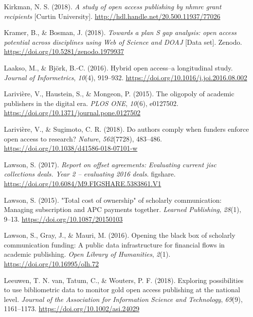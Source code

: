 \documentclass[a4paper,man,floatsintext,longtable,noextraspace,12pt]{apa6}
\newlength{\cslhangindent}
\newenvironment{cslreferences}%
  {\setlength{\parindent}{0pt}%
  \everypar{\setlength{\hangindent}{\cslhangindent}}\ignorespaces}%
  {\par}
\begin{document}
\begin{cslreferences}
\leavevmode\hypertarget{ref-Kirkman_2018}{}%
Kirkman, N. S. (2018). \emph{A study of open access publishing by nhmrc
grant recipients} {[}Curtin University{]}.
\url{http://hdl.handle.net/20.500.11937/77026}

\leavevmode\hypertarget{ref-Kramer_2018}{}%
Kramer, B., \& Bosman, J. (2018). \emph{Towards a plan S gap analysis:
open access potential across disciplines using Web of Science and DOAJ}
{[}Data set{]}. Zenodo. \url{https://doi.org/10.5281/zenodo.1979937}

\leavevmode\hypertarget{ref-Laakso_2016}{}%
Laakso, M., \& Björk, B.-C. (2016). Hybrid open access--a longitudinal
study. \emph{Journal of Informetrics}, \emph{10}(4), 919--932.
\url{https://doi.org/10.1016/j.joi.2016.08.002}

\leavevmode\hypertarget{ref-Larivi_re_2015}{}%
Larivière, V., Haustein, S., \& Mongeon, P. (2015). The oligopoly of
academic publishers in the digital era. \emph{PLOS ONE}, \emph{10}(6),
e0127502. \url{https://doi.org/10.1371/journal.pone.0127502}

\leavevmode\hypertarget{ref-Larivi_re_2018}{}%
Larivière, V., \& Sugimoto, C. R. (2018). Do authors comply when funders
enforce open access to research? \emph{Nature}, \emph{562}(7728),
483--486. \url{https://doi.org/10.1038/d41586-018-07101-w}

\leavevmode\hypertarget{ref-Lawson_2018}{}%
Lawson, S. (2017). \emph{Report on offset agreements: Evaluating current
jisc collections deals. Year 2 -- evaluating 2016 deals}. figshare.
\url{https://doi.org/10.6084/M9.FIGSHARE.5383861.V1}

\leavevmode\hypertarget{ref-Lawson_2015}{}%
Lawson, S. (2015). "Total cost of ownership" of scholarly communication:
Managing subscription and APC payments together. \emph{Learned
Publishing}, \emph{28}(1), 9--13. \url{https://doi.org/10.1087/20150103}

\leavevmode\hypertarget{ref-Lawson_2016}{}%
Lawson, S., Gray, J., \& Mauri, M. (2016). Opening the black box of
scholarly communication funding: A public data infrastructure for
financial flows in academic publishing. \emph{Open Library of
Humanities}, \emph{2}(1). \url{https://doi.org/10.16995/olh.72}

\leavevmode\hypertarget{ref-van_Leeuwen_2018}{}%
Leeuwen, T. N. van, Tatum, C., \& Wouters, P. F. (2018). Exploring
possibilities to use bibliometric data to monitor gold open access
publishing at the national level. \emph{Journal of the Association for
Information Science and Technology}, \emph{69}(9), 1161--1173.
\url{https://doi.org/10.1002/asi.24029}


\end{cslreferences}
\end{document}
